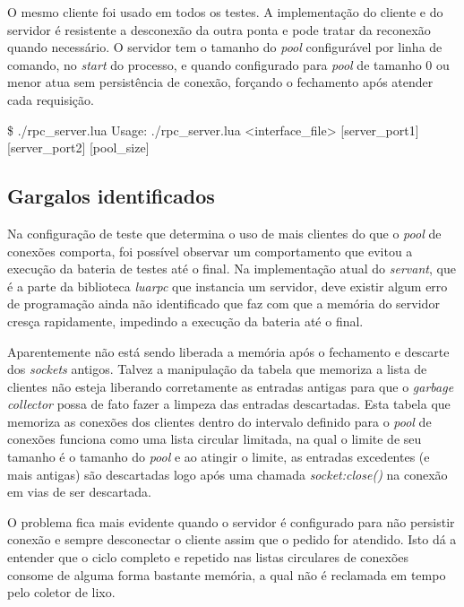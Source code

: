 \documentclass[11pt]{article}
\begin{document}
O mesmo cliente foi usado em todos os testes. A implementação do cliente e do
servidor é resistente a desconexão da outra ponta e pode tratar da reconexão
quando necessário. O servidor tem o tamanho do \textit{pool} configurável por
linha de comando, no \textit{start} do processo, e quando configurado para
\textit{pool} de tamanho 0 ou menor atua sem persistência de conexão, forçando o
fechamento após atender cada requisição.

\$ ./rpc\_server.lua
Usage: ./rpc\_server.lua <interface\_file> [server\_port1] [server\_port2]
[pool\_size]

\subsection{Gargalos identificados}\label{subsec:bottle}

Na configuração de teste que determina o uso de mais clientes do que o
\textit{pool} de conexões comporta, foi possível observar um comportamento que
evitou a execução da bateria de testes até o final. Na implementação atual do
\textit{servant}, que é a parte da biblioteca \textit{luarpc} que instancia
um servidor, deve existir algum erro de programação ainda não identificado que
faz com que a memória do servidor cresça rapidamente, impedindo a execução da
bateria até o final.

Aparentemente não está sendo liberada a memória após o
fechamento e descarte dos \textit{sockets} antigos. Talvez a manipulação da
tabela que memoriza a lista de clientes não esteja liberando corretamente as
entradas antigas para que o \textit{garbage collector} possa de fato fazer a
limpeza das entradas descartadas. Esta tabela que memoriza as conexões dos
clientes dentro do intervalo definido para o \textit{pool} de conexões funciona
como uma lista circular limitada, na qual o limite de seu tamanho é o tamanho do
\textit{pool} e ao atingir o limite, as entradas excedentes (e mais antigas) são
descartadas logo após uma chamada \textit{socket:close()} na conexão em vias de
ser descartada.

O problema fica mais evidente quando o servidor é configurado para não persistir
conexão e sempre desconectar o cliente assim que o pedido for atendido. Isto dá
a entender que o ciclo completo e repetido nas listas circulares de conexões
consome de alguma forma bastante memória, a qual não é reclamada em tempo pelo
coletor de lixo.
\end{document}
